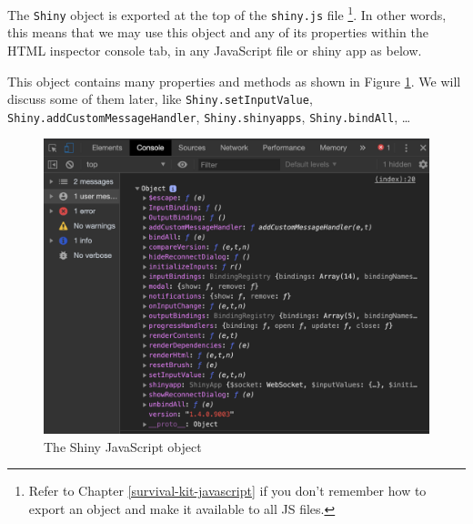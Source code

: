 \documentclass[]{book}
\newenvironment{Shaded}{\begin{snugshade}}{\end{snugshade}}
\newcommand{\ControlFlowTok}[1]{\textcolor[rgb]{0.13,0.29,0.53}{\textbf{#1}}}
\newcommand{\KeywordTok}[1]{\textcolor[rgb]{0.13,0.29,0.53}{\textbf{#1}}}
\newcommand{\NormalTok}[1]{#1}
\newcommand{\OperatorTok}[1]{\textcolor[rgb]{0.81,0.36,0.00}{\textbf{#1}}}
\newcommand{\StringTok}[1]{\textcolor[rgb]{0.31,0.60,0.02}{#1}}
\begin{document}
The \texttt{Shiny} object is exported at the top of the \texttt{shiny.js} file \footnote{Refer to Chapter \ref{survival-kit-javascript} if you don't remember how to export an object and make it available to all JS files.}. In other words, this means that we may use this object and any of its properties within the HTML inspector console tab, in any JavaScript file or shiny app as below.

\begin{Shaded}
\end{Shaded}

This object contains many properties and methods as shown in Figure \ref{fig:shiny-object}. We will discuss some of them later, like \texttt{Shiny.setInputValue}, \texttt{Shiny.addCustomMessageHandler}, \texttt{Shiny.shinyapps}, \texttt{Shiny.bindAll}, \ldots{}

\begin{figure}
\includegraphics[width=17.44in]{images/survival-kit/shiny-object} \caption{The Shiny JavaScript object}\label{fig:shiny-object}
\end{figure}
\end{document}
